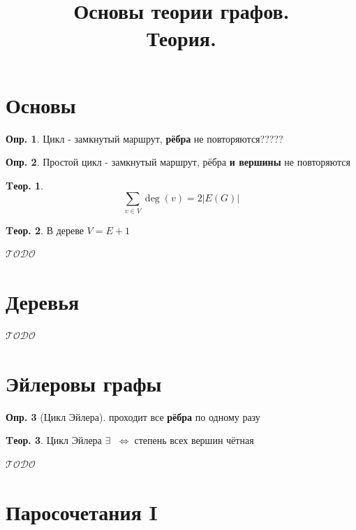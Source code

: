 \documentclass[a4paper,12pt]{article}
\title{Основы теории графов.\\Теория.}
\author{}
\date{}
\numberwithin{figure}{section}
\theoremstyle{definition}
\newtheorem{definition}{Опр.}[section]
\theoremstyle{definition}
\newtheorem{theorem}{Tеор.}[section]
\def\iiff{$\;\Longleftrightarrow\;$}
\def\iiTODO{\guillemotleft$\mathcal{TODO}$\guillemotright\textellipsis}
\begin{document}
\maketitle

\tableofcontents



\section{Основы}

\begin{definition}
	Цикл - замкнутый маршрут, \textbf{рёбра} не повторяются?????
\end{definition}

\begin{definition}
	Простой цикл - замкнутый маршрут, рёбра \textbf{и вершины} не повторяются
\end{definition}

\begin{theorem}
	\[ \sum_{v \in V} \deg(v) = 2 |E(G)|  \]
\end{theorem}

\begin{theorem}
	В дереве $V = E+1$
\end{theorem}

\iiTODO



\section{Деревья}

\iiTODO



\section{Эйлеровы графы}

\begin{definition}[Цикл Эйлера] проходит все \textbf{рёбра} по одному разу \end{definition}

\begin{theorem}
	Цикл Эйлера $\exists$ \iiff степень всех вершин чётная
\end{theorem}

\iiTODO



\section{Паросочетания I}
\end{document}
